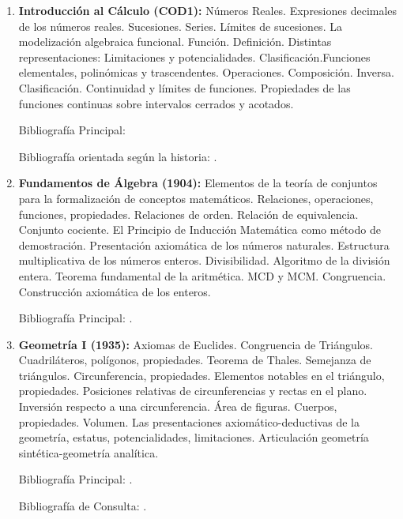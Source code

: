 \documentclass[a4paper, 12pt]{article}
\begin{document}
\begin{enumerate}

\item \textbf{Introducción al Cálculo  (COD1):} Números Reales. Expresiones decimales de los números reales. Sucesiones. Series. Límites de sucesiones. La modelización algebraica funcional. Función. Definición. Distintas representaciones: Limitaciones y potencialidades. Clasificación.Funciones elementales, polinómicas y trascendentes. Operaciones. Composición. Inversa. Clasificación.  Continuidad y límites de funciones. Propiedades de las funciones continuas sobre intervalos cerrados y acotados. 

Bibliografía Principal: \cite{PeterD.Lax631,MichaelSpivak649,thomas2005calculo}

Bibliografía orientada según la historia: \cite{ErnstHairer633,DavidApplebaum639,OttoToeplitz642,DavidBressoud643,DavidM.Bressoud651,DavidM.Bressoud688}.


 
\item \textbf{Fundamentos de Álgebra (1904):}
Elementos de la teoría de conjuntos para la formalización de conceptos matemáticos. Relaciones, operaciones, funciones, propiedades. Relaciones de orden. Relación de equivalencia. Conjunto cociente. El Principio de Inducción Matemática como método de demostración. Presentación axiomática de los números naturales. Estructura multiplicativa de los números enteros. Divisibilidad. Algoritmo de la división entera. Teorema fundamental de la aritmética. MCD y MCM. Congruencia.  Construcción axiomática de los enteros.


Bibliografía Principal: \cite{gentile, grimaldi}.




\item \textbf{Geometría I (1935):} Axiomas de Euclides. Congruencia de Triángulos. Cuadriláteros, polígonos, propiedades. Teorema de Thales. Semejanza de triángulos. Circunferencia, propiedades. Elementos notables en el triángulo, propiedades. Posiciones relativas de circunferencias y rectas en el plano. Inversión respecto a una circunferencia. Área de figuras.  Cuerpos, propiedades. Volumen.  Las presentaciones axiomático-deductivas de la geometría, estatus, potencialidades, limitaciones. Articulación geometría sintética-geometría analítica.

Bibliografía Principal: \cite{AllanBerele41,RogerFenn248,RobinHartshorne131,AlfredS.Posamentier49}.

Bibliografía de Consulta: \cite{O.Bottema149,CharlesStanleyOgilvy129,AllanBerele41,GerardA.Venema145,H.S.M.Coxeter226,H.S.M.Coxeter35,MatthewHarvey261,RogerA.Johnson42,coxeter,GJE,villamayor}.





\end{enumerate}
\end{document}
